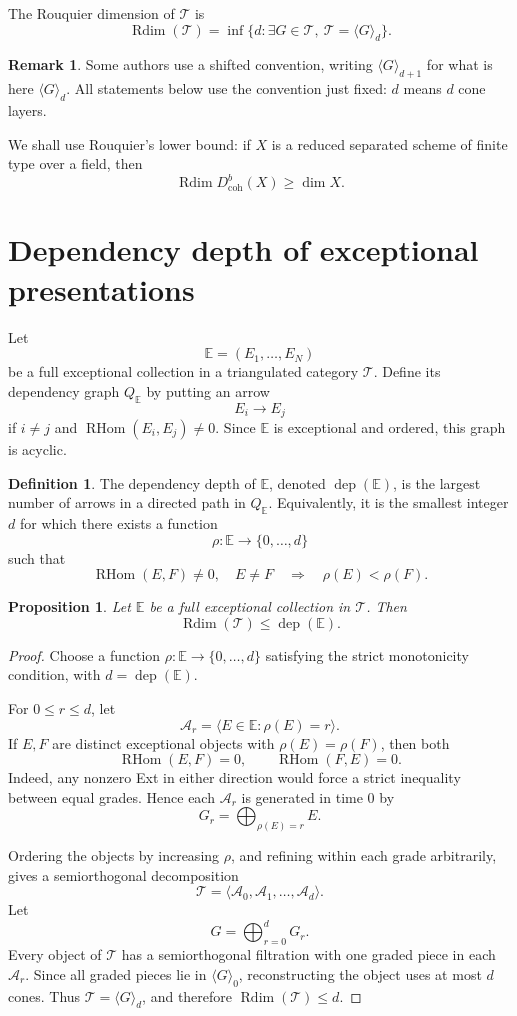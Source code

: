 \documentclass[11pt]{amsart}
\numberwithin{equation}{section}
\newtheorem{proposition}[theorem]{Proposition}
\theoremstyle{definition}
\newtheorem{definition}[theorem]{Definition}
\newtheorem{remark}[theorem]{Remark}
\DeclareMathOperator{\Rdim}{Rdim}
\DeclareMathOperator{\RHom}{RHom}
\DeclareMathOperator{\dep}{dep}
\newcommand{\Db}{D^b_{\mathrm{coh}}}
\begin{document}
The Rouquier dimension of $\mathcal T$ is
\[
\Rdim(\mathcal T)=
\inf\{d:\exists G\in\mathcal T,\ \mathcal T=\langle G\rangle_d\}.
\]

\begin{remark}
Some authors use a shifted convention, writing $\langle G\rangle_{d+1}$ for what is here $\langle G\rangle_d$. All statements below use the convention just fixed: $d$ means $d$ cone layers.
\end{remark}

We shall use Rouquier's lower bound: if $X$ is a reduced separated scheme of finite type over a field, then
\[
\Rdim \Db(X)\ge \dim X.
\]

\section{Dependency depth of exceptional presentations}

Let
\[
\mathbb E=(E_1,\dots,E_N)
\]
be a full exceptional collection in a triangulated category $\mathcal T$. Define its dependency graph $Q_{\mathbb E}$ by putting an arrow
\[
E_i\longrightarrow E_j
\]
if $i\ne j$ and $\RHom(E_i,E_j)\ne0$. Since $\mathbb E$ is exceptional and ordered, this graph is acyclic.

\begin{definition}
The dependency depth of $\mathbb E$, denoted $\dep(\mathbb E)$, is the largest number of arrows in a directed path in $Q_{\mathbb E}$. Equivalently, it is the smallest integer $d$ for which there exists a function
\[
\rho:\mathbb E\to\{0,\dots,d\}
\]
such that
\[
\RHom(E,F)\ne0,\quad E\ne F
\quad\Longrightarrow\quad
\rho(E)<\rho(F).
\]
\end{definition}

\begin{proposition}
Let $\mathbb E$ be a full exceptional collection in $\mathcal T$. Then
\[
\Rdim(\mathcal T)\le \dep(\mathbb E).
\]
\end{proposition}

\begin{proof}
Choose a function $\rho:\mathbb E\to\{0,\dots,d\}$ satisfying the strict monotonicity condition, with $d=\dep(\mathbb E)$.

For $0\le r\le d$, let
\[
\mathcal A_r=\langle E\in\mathbb E:\rho(E)=r\rangle.
\]
If $E,F$ are distinct exceptional objects with $\rho(E)=\rho(F)$, then both
\[
\RHom(E,F)=0,
\qquad
\RHom(F,E)=0.
\]
Indeed, any nonzero Ext in either direction would force a strict inequality between equal grades. Hence each $\mathcal A_r$ is generated in time $0$ by
\[
G_r=\bigoplus_{\rho(E)=r}E.
\]

Ordering the objects by increasing $\rho$, and refining within each grade arbitrarily, gives a semiorthogonal decomposition
\[
\mathcal T=
\langle
\mathcal A_0,\mathcal A_1,\dots,\mathcal A_d
\rangle.
\]
Let
\[
G=\bigoplus_{r=0}^dG_r.
\]
Every object of $\mathcal T$ has a semiorthogonal filtration with one graded piece in each $\mathcal A_r$. Since all graded pieces lie in $\langle G\rangle_0$, reconstructing the object uses at most $d$ cones. Thus $\mathcal T=\langle G\rangle_d$, and therefore $\Rdim(\mathcal T)\le d$.
\end{proof}
\end{document}
